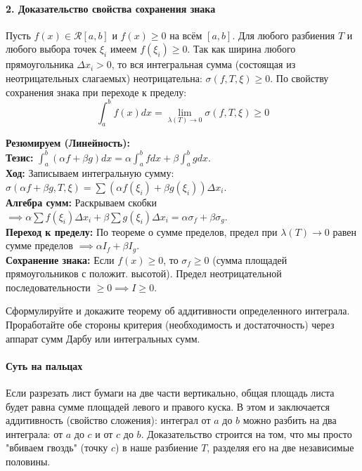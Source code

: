 \paragraph{2. Доказательство свойства сохранения знака}
Пусть $f(x) \in \mathcal{R}[a, b]$ и $f(x) \ge 0$ на всём $[a, b]$. 
Для любого разбиения $T$ и любого выбора точек $\xi_i$ имеем $f(\xi_i) \ge 0$. Так как ширина любого прямоугольника $\Delta x_i > 0$, то вся интегральная сумма (состоящая из неотрицательных слагаемых) неотрицательна: $\sigma(f, T, \xi) \ge 0$.
По свойству сохранения знака при переходе к пределу:
$$ \int_a^b f(x) dx = \lim_{\lambda(T)\to0} \sigma(f, T, \xi) \ge 0 $$


\begin{tcolorbox}[colback=gray!5, colframe=black, boxrule=0.5pt, arc=0pt]
\textbf{Резюмируем (Линейность):} \\
\textbf{Тезис:} $\int_a^b (\alpha f + \beta g) dx = \alpha \int_a^b f dx + \beta \int_a^b g dx$. \\
\textbf{Ход:} Записываем интегральную сумму: $\sigma(\alpha f + \beta g, T, \xi) = \sum (\alpha f(\xi_i) + \beta g(\xi_i)) \Delta x_i$. \\
\textbf{Алгебра сумм:} Раскрываем скобки $\implies \alpha \sum f(\xi_i)\Delta x_i + \beta \sum g(\xi_i)\Delta x_i = \alpha \sigma_f + \beta \sigma_g$. \\
\textbf{Переход к пределу:} По теореме о сумме пределов, предел при $\lambda(T) \to 0$ равен сумме пределов $\implies \alpha I_f + \beta I_g$. \\
\textbf{Сохранение знака:} Если $f(x) \ge 0$, то $\sigma_f \ge 0$ (сумма площадей прямоугольников с положит. высотой). Предел неотрицательной последовательности $\ge 0 \implies I \ge 0$.
\end{tcolorbox}

{Сформулируйте и докажите теорему об аддитивности определенного интеграла. Проработайте обе стороны критерия (необходимость и достаточность) через аппарат сумм Дарбу или интегральных сумм.}

\paragraph{Суть на пальцах}
Если разрезать лист бумаги на две части вертикально, общая площадь листа будет равна сумме площадей левого и правого куска. В этом и заключается аддитивность (свойство сложения): интеграл от $a$ до $b$ можно разбить на два интеграла: от $a$ до $c$ и от $c$ до $b$. Доказательство строится на том, что мы просто "вбиваем гвоздь" (точку $c$) в наше разбиение $T$, разделяя его на две независимые половины.

